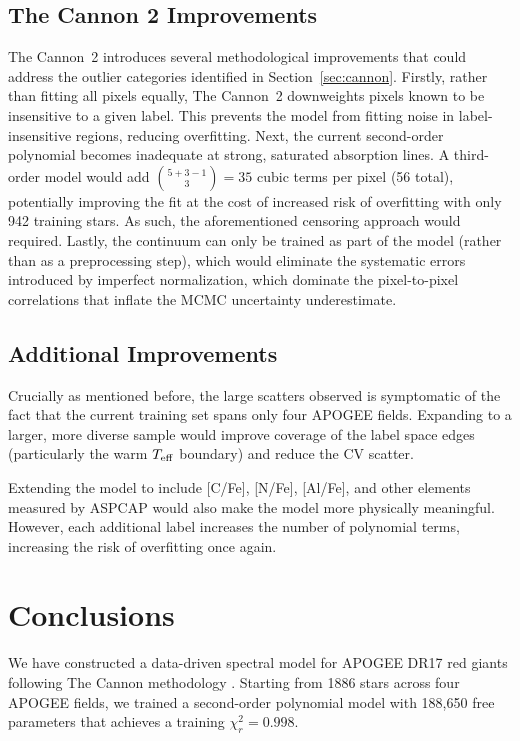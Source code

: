 \documentclass[10pt,preprint2]{aastex}
\begin{document}
\subsection{The Cannon 2 Improvements}

The Cannon~2 \citep{Casey2016} introduces several methodological improvements that could address the outlier categories identified in Section~\ref{sec:cannon}. Firstly, rather than fitting all pixels equally, The Cannon~2 downweights pixels known to be insensitive to a given label. This prevents the model from fitting noise in label-insensitive regions, reducing overfitting. Next, the current second-order polynomial becomes inadequate at strong, saturated absorption lines. A third-order model would add $\binom{5+3-1}{3} = 35$ cubic terms per pixel (56 total), potentially improving the fit at the cost of increased risk of overfitting with only 942 training stars. As such, the aforementioned censoring approach would required. Lastly, the continuum can only be trained as part of the model (rather than as a preprocessing step), which would eliminate the systematic errors introduced by imperfect normalization, which dominate the pixel-to-pixel correlations that inflate the MCMC uncertainty underestimate.

\subsection{Additional Improvements}

Crucially as mentioned before, the large scatters observed is symptomatic of the fact that the current training set spans only four APOGEE fields. Expanding to a larger, more diverse sample would improve coverage of the label space edges (particularly the warm $T_{\rm eff}$ boundary) and reduce the CV scatter.

Extending the model to include [C/Fe], [N/Fe], [Al/Fe], and other elements measured by ASPCAP would also make the model more physically meaningful. However, each additional label increases the number of polynomial terms, increasing the risk of overfitting once again.

\section{Conclusions}
\label{sec:conclusions}

We have constructed a data-driven spectral model for APOGEE DR17 red giants following The Cannon methodology \citep{Ness2015}. Starting from 1886 stars across four APOGEE fields, we trained a second-order polynomial model with 188,650 free parameters that achieves a training $\chi^2_r = 0.998$.
\end{document}
